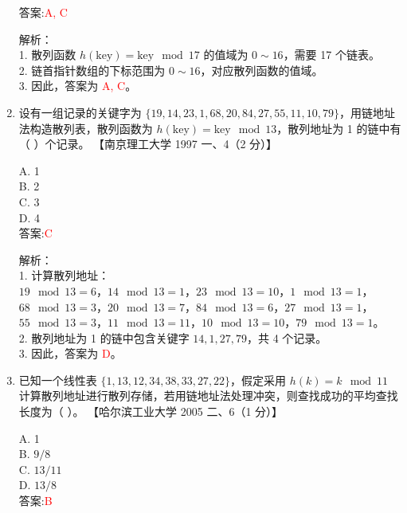 \documentclass[lang=cn,newtx,10pt,scheme=chinese]{../../../elegantbook}
\begin{document}
\begin{enumerate}
    答案:\textcolor{red}{A, C}

    解析：\\
    1. 散列函数 $h(\text{key}) = \text{key} \mod 17$ 的值域为 $0 \sim 16$，需要 17 个链表。\\
    2. 链首指针数组的下标范围为 $0 \sim 16$，对应散列函数的值域。\\
    3. 因此，答案为 \textcolor{red}{A, C}。\\

\item 设有一组记录的关键字为 $\{19, 14, 23, 1, 68, 20, 84, 27, 55, 11, 10, 79\}$，用链地址法构造散列表，散列函数为 $h(\text{key}) = \text{key} \mod 13$，散列地址为 1 的链中有（ ）个记录。  
    【南京理工大学 1997 一、4（2 分）】  

    A. 1 \\  
    B. 2 \\  
    C. 3 \\  
    D. 4 \\  

    答案:\textcolor{red}{C}

    解析：\\
    1. 计算散列地址：\\
       $19 \mod 13 = 6$，$14 \mod 13 = 1$，$23 \mod 13 = 10$，$1 \mod 13 = 1$，\\
       $68 \mod 13 = 3$，$20 \mod 13 = 7$，$84 \mod 13 = 6$，$27 \mod 13 = 1$，\\
       $55 \mod 13 = 3$，$11 \mod 13 = 11$，$10 \mod 13 = 10$，$79 \mod 13 = 1$。\\
    2. 散列地址为 1 的链中包含关键字 $14, 1, 27, 79$，共 4 个记录。\\
    3. 因此，答案为 \textcolor{red}{D}。\\

    \item 已知一个线性表 $\{1, 13, 12, 34, 38, 33, 27, 22\}$，假定采用 $h(k) = k \mod 11$ 计算散列地址进行散列存储，若用链地址法处理冲突，则查找成功的平均查找长度为（ ）。  
    【哈尔滨工业大学 2005 二、6（1 分）】  

    A. 1 \\  
    B. $9/8$ \\  
    C. $13/11$ \\  
    D. $13/8$ \\  

    答案:\textcolor{red}{B}


\end{enumerate}
\end{document}
